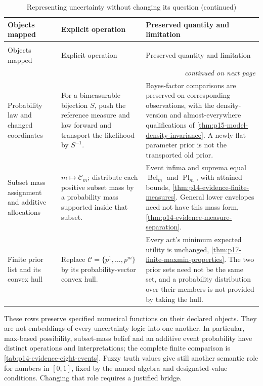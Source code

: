 \begin{longtable}{@{}p{}p{}p{}@{}}
\caption{Representing uncertainty without changing its question}\\
\toprule
Objects mapped & Explicit operation & Preserved quantity and limitation \\
\midrule
\endfirsthead
\caption[]{Representing uncertainty without changing its question (continued)}\\
\toprule
Objects mapped & Explicit operation & Preserved quantity and limitation \\
\midrule
\endhead
\midrule\multicolumn{3}{r}{\emph{continued on next page}}\\
\endfoot
\endlastfoot
Probability law and changed coordinates & For a bimeasurable bijection
\(S\), push the reference measure and law forward and transport the
likelihood by \(S^{-1}\). & Bayes-factor comparisons are preserved on
corresponding observations, with the density-version and almost-everywhere
qualifications of \cref{thm:p15-model-density-invariance}. A newly flat
parameter prior is not the transported old prior. \\
Subset mass assignment and additive allocations &
\(m\mapsto\mathcal C_m\); distribute each positive subset mass by a
probability mass supported inside that subset. & Event infima and suprema
equal \(\operatorname{Bel}_m\) and \(\operatorname{Pl}_m\), with attained
bounds, \cref{thm:p14-evidence-finite-measures}. General lower envelopes
need not have this mass form, \cref{thm:p14-evidence-measure-separation}. \\
Finite prior list and its convex hull &
Replace \(\mathcal C=\{p^1,\ldots,p^m\}\) by its probability-vector
convex hull. & Every act's minimum expected utility is unchanged,
\cref{thm:p17-finite-maxmin-properties}. The two prior sets need not be
the same set, and a probability distribution over their members is not
provided by taking the hull. \\
\bottomrule
\end{longtable}

These rows preserve specified numerical functions on their declared
objects. They are not embeddings of every uncertainty logic into one
another. In particular, max-based possibility, subset-mass belief and an
additive event probability have distinct operations and interpretations;
the complete finite comparison is \cref{tab:p14-evidence-eight-events}.
Fuzzy truth values give still another semantic role for numbers in
\([0,1]\), fixed by the named algebra and designated-value conditions.
Changing that role requires a justified bridge.

